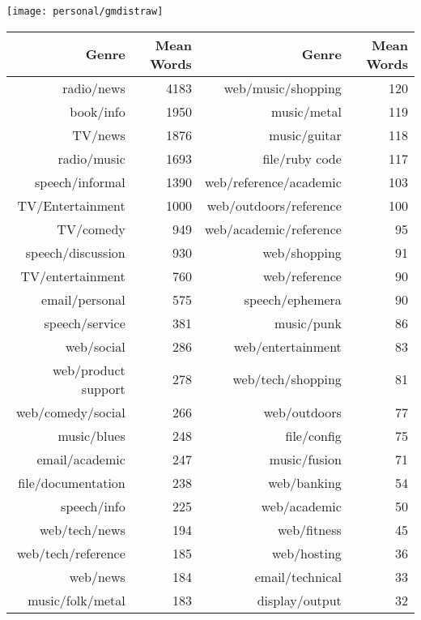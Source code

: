\begin{table}[ht]
    \centering

    \texttt{[image: personal/gmdistraw]}%
    \vspace{20pt}

    \begin{tabular}{r r || r r}
        \hline 
        Genre & Mean Words & Genre & Mean Words \\
        \hline 
        radio/news & 4183 &  web/music/shopping &  120 \\
        book/info & 1950   &  music/metal &  119 \\
        TV/news & 1876   &  music/guitar &  118 \\
        radio/music & 1693   &  file/ruby code &  117 \\
        speech/informal & 1390   &  web/reference/academic &  103 \\
        TV/Entertainment & 1000  &  web/outdoors/reference &  100 \\
        TV/comedy &  949  &  web/academic/reference &   95 \\
        speech/discussion &  930  &  web/shopping &   91 \\
        TV/entertainment &  760 &  web/reference &   90 \\
        email/personal &  575  &  speech/ephemera &   90 \\
        speech/service &  381  &  music/punk &   86 \\
        web/social &  286  &  web/entertainment &   83 \\
        web/product support &  278  &  web/tech/shopping &   81 \\
        web/comedy/social &  266  &  web/outdoors &   77 \\
        music/blues &  248  &  file/config &   75 \\
        email/academic &  247  &  music/fusion &   71 \\
        file/documentation &  238  &  web/banking &   54 \\
        speech/info &  225  &  web/academic &   50 \\
        web/tech/news &  194  &  web/fitness &   45 \\
        web/tech/reference &  185  &  web/hosting &   36 \\
        web/news &  184  &  email/technical &   33 \\
        music/folk/metal &  183  &  display/output &   32 \\

\end{tabular}
\end{table}
